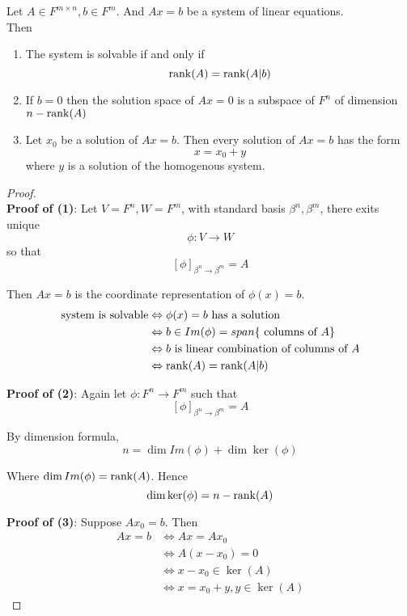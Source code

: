 \begin{theorem}
    Let $A \in F^{m \times n}, b \in F^m$. And $Ax = b$ be a system of linear equations. \\

    Then 
    \begin{enumerate}
        \item The system is solvable if and only if 
        \[
            \rank(A) = \rank(A | b)
        \]
        \item If $b = 0$ then the solution space of $Ax = 0$ is a subspace of $F^n$ of dimension $n - \rank(A)$
        \item Let $x_0$ be a solution of $Ax = b$. Then every solution of $Ax = b$ has the form 
        \[
            x = x_0 + y
        \]
        where $y$ is a solution of the homogenous system. 
    \end{enumerate} 
\end{theorem}
\begin{proof} \\

\textbf{Proof of (1)}: Let $V = F^n, W = F^m$, with standard basis $\beta^n, \beta^m$, there exits unique 
\[
    \phi: V \to W
\]
so that 
\[
    [\phi]_{\beta^n \to \beta^m}  = A
\]

Then $Ax = b$ is the coordinate representation of $\phi (x) = b$. 
\begin{align*}
    \text{system is solvable} & \Leftrightarrow \phi(x) = b \text{ has a solution} \\
    & \Leftrightarrow b \in Im( \phi) = span \{ \text{ columns of } A \}  \\
    & \Leftrightarrow b \text{ is linear combination of columns of } A \\
    & \Leftrightarrow \rank(A) = \rank(A | b)
\end{align*}

\textbf{Proof of (2)}: Again let $ \phi: F^n \to F^m$ such that 
\[
    \left[ \phi \right]_{\beta^n \to \beta^m} = A
\]

By dimension formula, 
\[
    n = \dim Im( \phi) + \dim \ker( \phi)
\]

Where $\dim Im( \phi) = \rank(A)$. 
Hence 
\[
    \dim \ker( \phi) = n - \rank(A)
\]

\textbf{Proof of (3)}: Suppose $Ax_0 = b$. Then 
\begin{align*}
    Ax = b & \iff Ax = Ax_0 \\
    & \iff A(x - x_0) = 0 \\
    &\iff x - x_0 \in \ker(A) \\
    & \iff x = x_0 + y, y \in \ker(A)
\end{align*}





\end{proof}





















\newpage